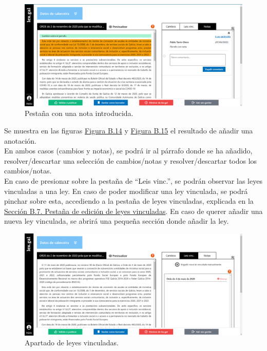 \begin{figure}[H]
\centerline{\includegraphics[width=13cm]{figuras/manualUsuario/PestanaNotas.PNG}}
\caption{Pestaña con una nota introducida.}
\label{enlacePestanaNotas}
\end{figure}

Se muestra en las figuras \hyperref[enlaceNotas]{Figura B.14} y \hyperref[enlacePestanaNotas]{Figura B.15} el resultado de añadir una anotación.
\\

En ambos casos (cambios y notas), se podrá ir al párrafo donde se ha añadido, resolver/descartar una selección de cambios/notas y resolver/descartar todos los cambios/notas.
\\

En caso de presionar sobre la pestaña de ``Leis vinc.'', se podrán observar las leyes vinculadas a una ley. En caso de poder modificar una ley vinculada, se podrá pinchar sobre esta, accediendo a la pestaña de leyes vinculadas, explicada en la \hyperref[PPrevisualizacionLexGal]{Sección B.7. Pestaña de edición de leyes vinculadas}. En caso de querer añadir una nueva ley vinculada, se abrirá una pequeña sección donde añadir la ley.

\begin{figure}[H]
\centerline{\includegraphics[width=13cm]{figuras/manualUsuario/LeyesVinculadas.PNG}}
\caption{Apartado de leyes vinculadas.}
\label{enlaceLeyesVinculadas}
\end{figure}

